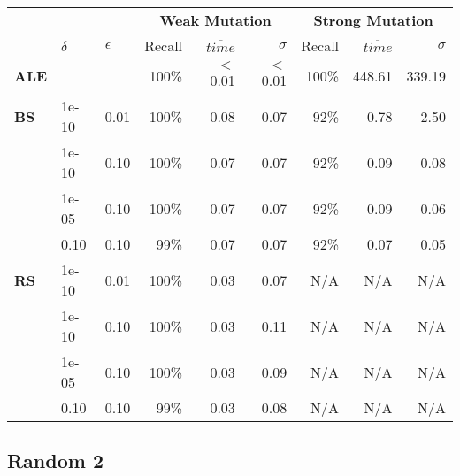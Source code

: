 \begin{small} 
\begin{tabular}{lll|r|r|r|r|r|r} 
 & & & \multicolumn{3}{c|}{\textbf{Weak Mutation}} & \multicolumn{3}{c}{\textbf{Strong Mutation}}\\ 
 & $\delta$ & $\epsilon$ & Recall & $\overline{time}$ & $\sigma$ & Recall & $\overline{time}$ & $\sigma$ \\  
\hline 
\textbf{ALE} & & & 100\% & $<$0.01  & $<$0.01  & 100\% & 448.61  & 339.19  \\ 
\textbf{BS}  & 1e-10  & 0.01  & 100\% & 0.08  & 0.07  & 92\% & 0.78  & 2.50\\
 & 1e-10  & 0.10  & 100\% & 0.07  & 0.07  & 92\% & 0.09  & 0.08\\
 & 1e-05  & 0.10  & 100\% & 0.07  & 0.07  & 92\% & 0.09  & 0.06\\
 & 0.10  & 0.10  & 99\% & 0.07  & 0.07  & 92\% & 0.07  & 0.05\\
\textbf{RS}  & 1e-10  & 0.01  & 100\% & 0.03  & 0.07 & N/A & N/A & N/A \\
 & 1e-10  & 0.10  & 100\% & 0.03  & 0.11 & N/A & N/A & N/A \\
 & 1e-05  & 0.10  & 100\% & 0.03  & 0.09 & N/A & N/A & N/A \\
 & 0.10  & 0.10  & 99\% & 0.03  & 0.08 & N/A & N/A & N/A \\
\end{tabular} 
\end{small} 


\subsection{Random 2}

